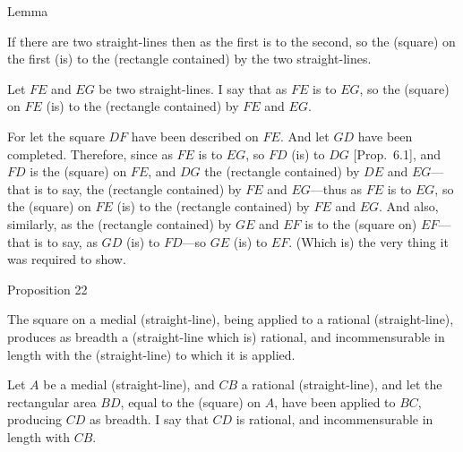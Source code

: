 
\begin{center}
{\large Lemma}
\end{center}

If there are two straight-lines then as the first is to the second, so the
(square) on the first (is) to the (rectangle contained) by the two straight-lines.

\epsfysize=1.1in
\centerline{}

Let $FE$ and $EG$ be two straight-lines. I say that as $FE$ is to $EG$,
so the (square) on $FE$ (is) to the (rectangle contained) by $FE$ and $EG$.

For let the square $DF$ have been described on $FE$. And let $GD$ have
been completed. Therefore, since as $FE$ is to $EG$, so
$FD$ (is) to $DG$ [Prop.~6.1], and
$FD$ is the (square) on  $FE$, and $DG$ the (rectangle contained) by $DE$ and $EG$---that is to say,
the (rectangle contained) by $FE$ and $EG$---thus as $FE$ is to $EG$,
so the (square) on $FE$ (is) to the (rectangle contained) by $FE$ and $EG$. 
And also, similarly, as the (rectangle contained) by $GE$ and $EF$ is to the
(square on) $EF$---that is to say, as $GD$ (is) to $FD$---so $GE$
(is) to $EF$. (Which is) the very thing it was required to show.


\begin{center}
{\large Proposition 22}
\end{center}

The square on a medial (straight-line), being
applied to a rational (straight-line), produces as breadth a (straight-line which
is) rational, and incommensurable in length with the (straight-line) to which it is applied.

\epsfysize=2in
\centerline{}

Let $A$ be a medial (straight-line), and $CB$ a rational (straight-line),
and let the rectangular area $BD$, equal to the (square) on $A$, have
been applied to $BC$, producing $CD$ as breadth. I say that
$CD$ is rational, and incommensurable in  length with $CB$.

